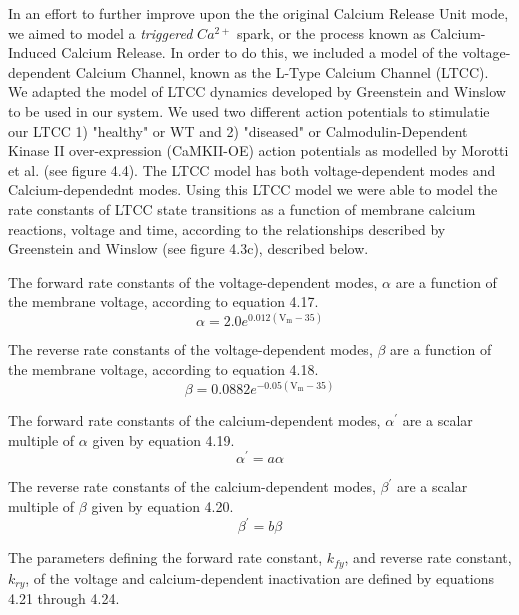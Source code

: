 \documentclass[12pt]{ucsddissertation}
\begin{document}
In an effort to further improve upon the the original Calcium Release Unit mode, we aimed to model a \textit{triggered} $Ca^{2+}$ spark, or the process known as Calcium-Induced Calcium Release. In order to do this, we included a model of the voltage-dependent Calcium Channel, known as the L-Type Calcium Channel (LTCC). We adapted the model of LTCC dynamics developed by Greenstein and Winslow \cite{Greenstein2002} to be used in our system. We used two different action potentials to stimulatie our LTCC 1) "healthy" or WT and 2) "diseased" or Calmodulin-Dependent Kinase II over-expression (CaMKII-OE) action potentials as modelled by Morotti et al. \cite{Morotti2014} (see figure 4.4). The LTCC model has both voltage-dependent modes and Calcium-dependednt modes. Using this LTCC model we were able to model the rate constants of LTCC state transitions as a function of membrane calcium reactions, voltage and time, according to the relationships described by Greenstein and Winslow (see figure 4.3c), described below.

The forward rate constants of the voltage-dependent modes, $\alpha$ are a function of the membrane voltage, according to equation 4.17. 
\begin{equation}
\alpha = 2.0 e ^ { 0.012 \left( \mathrm { V } _ { \mathrm { m } } - 35 \right) }
\end{equation}

The reverse rate constants of the voltage-dependent modes, $\beta$ are a function of the membrane voltage, according to equation 4.18. 
\begin{equation}
\beta = 0.0882 e ^ { - 0.05 \left( \mathrm { V } _ { \mathrm { m } } - 35 \right) }
\end{equation}

The forward rate constants of the calcium-dependent modes, $\alpha ^ { \prime }$ are a scalar multiple of $\alpha$ given by equation 4.19. 
\begin{equation}
\alpha ^ { \prime } = a \alpha
\end{equation}

The reverse rate constants of the calcium-dependent modes, $\beta ^ { \prime }$ are a scalar multiple of $\beta$ given by equation 4.20. 
\begin{equation}
\beta ^ { \prime } = b \beta
\end{equation}

The parameters defining the forward rate constant, $k_{ fy }$, and reverse rate constant, $k_{ ry }$, of the voltage and calcium-dependent inactivation are defined by equations 4.21 through 4.24.
\end{document}
